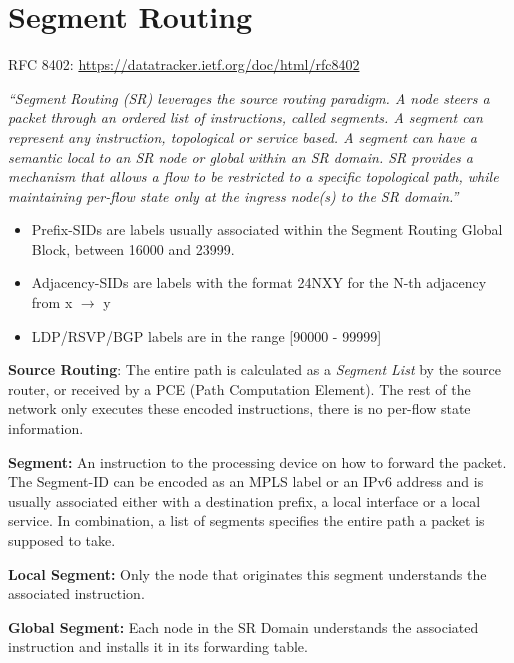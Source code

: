 \section{Segment Routing}

RFC 8402: \url{https://datatracker.ietf.org/doc/html/rfc8402}

\vspace{5mm}
\emph{``Segment Routing (SR) leverages the source routing paradigm.  A node 
   steers a packet through an ordered list of instructions, called 
   segments.  A segment can represent any instruction, topological or 
   service based.  A segment can have a semantic local to an SR node or 
   global within an SR domain.  SR provides a mechanism that allows a 
   flow to be restricted to a specific topological path, while 
   maintaining per-flow state only at the ingress node(s) to the SR 
   domain.''}

\begin{itemize}
    \item Prefix-SIDs are labels usually  associated within the Segment Routing Global Block, between 16000 and 23999.
    \item Adjacency-SIDs are labels with the format 24NXY for the N-th adjacency from x $ \rightarrow $ y
    \item LDP/RSVP/BGP labels are in the range  [90000 - 99999]
\end{itemize}

\vspace{5mm}
\textbf{Source Routing}: The entire path is calculated as a \emph{Segment List} by the source router, or received by a PCE (Path Computation Element). 
The rest of the network only executes these encoded instructions, there is no per-flow state information. 

\vspace{5mm}
\textbf{Segment:} An instruction to the processing device on how to forward the packet. 
The Segment-ID can be encoded as an MPLS label or an IPv6 address and is usually associated
either with a destination prefix, a local interface or a local service. 
In combination, a list of segments specifies the entire path a packet is supposed to take.

\vspace{5mm}
\textbf{Local Segment:} Only the node that originates this segment understands the associated instruction.

\vspace{5mm}
\textbf{Global Segment:} Each node in the SR Domain understands the associated instruction and installs it in its forwarding table.

